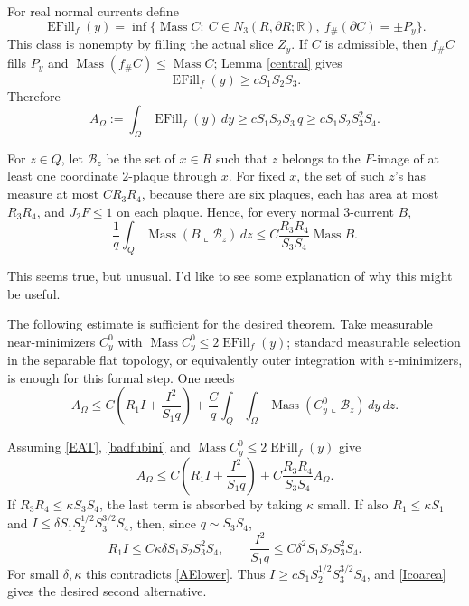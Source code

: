 \documentclass[12pt]{article}
\newcommand{\Mass}{\operatorname{Mass}}
\newcommand{\EFill}{\operatorname{EFill}}
\newcommand{\review}[1]{\begin{reviewbox}#1\end{reviewbox}}
\begin{document}
For real normal currents define
\[
\EFill_f(y)=\inf\{\Mass C:\ C\in N_3(R,\partial R;\mathbb R),\
        f_\#(\partial C)=\pm P_y\}.
\]
This class is nonempty by filling the actual slice \(Z_y\).  If \(C\) is
admissible, then \(f_\#C\) fills \(P_y\) and \(\Mass(f_\#C)\le\Mass C\);
Lemma \ref{central} gives
\begin{equation}\label{EFilllower}
        \EFill_f(y)\ge cS_1S_2S_3 .
\end{equation}
Therefore
\begin{equation}\label{AElower}
A_\Omega:=\int_\Omega\EFill_f(y)\,dy
        \ge cS_1S_2S_3\,q
        \ge cS_1S_2S_3^2S_4 .
\end{equation}

For \(z\in Q\), let \({\mathcal B}_z\) be the set of \(x\in R\) such that
\(z\) belongs to the \(F\)-image of at least one coordinate \(2\)-plaque
through \(x\).  For fixed \(x\), the set of such \(z\)'s has measure at most
\(CR_3R_4\), because there are six plaques, each has area at most \(R_3R_4\),
and \(J_2F\le1\) on each plaque.  Hence, for every normal \(3\)-current \(B\),
\begin{equation}\label{badfubini}
 \frac1q\int_Q\Mass(B\llcorner{\mathcal B}_z)\,dz
 \le C\frac{R_3R_4}{S_3S_4}\Mass B .
\end{equation}
\review{This seems true, but unusual. I'd like to see some explanation of why this might be useful.}

The following estimate is sufficient for the desired theorem.  Take measurable
near-minimizers \(C_y^0\) with
\(\Mass C_y^0\le2\EFill_f(y)\); standard measurable selection in the
separable flat topology, or equivalently outer integration with
\(\varepsilon\)-minimizers, is enough for this formal step.  One needs
\begin{equation}\tag{EAT}\label{EAT}
 A_\Omega
 \le C\left(R_1I+\frac{I^2}{S_1q}\right)
 +\frac{C}{q}\int_Q\int_\Omega
       \Mass(C_y^0\llcorner{\mathcal B}_z)\,dy\,dz .
\end{equation}

Assuming \eqref{EAT}, \eqref{badfubini} and
\(\Mass C_y^0\le2\EFill_f(y)\) give
\[
A_\Omega\le C\left(R_1I+\frac{I^2}{S_1q}\right)
  +C\frac{R_3R_4}{S_3S_4}A_\Omega .
\]
If \(R_3R_4\le\kappa S_3S_4\), the last term is absorbed by taking
\(\kappa\) small.  If also \(R_1\le\kappa S_1\) and
\(I\le\delta S_1S_2^{1/2}S_3^{3/2}S_4\), then, since \(q\sim S_3S_4\),
\[
R_1I\le C\kappa\delta S_1S_2S_3^2S_4,\qquad
\frac{I^2}{S_1q}\le C\delta^2S_1S_2S_3^2S_4 .
\]
For small \(\delta,\kappa\) this contradicts \eqref{AElower}.  Thus
\(I\ge cS_1S_2^{1/2}S_3^{3/2}S_4\), and \eqref{Icoarea} gives the desired
second alternative.
\end{document}
